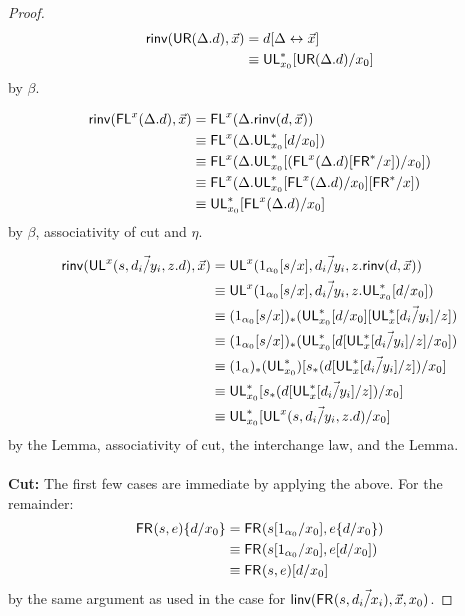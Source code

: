 \begin{proof}
\begin{align*}
\mathsf{rinv}(\mathsf{UR}(\Delta.d),\vec{x}) &= d[\Delta \leftrightarrow \vec{x}]\\
&\equiv \mathsf{UL}^*_{x_0}[\mathsf{UR}(\Delta.d)/x_0]
\end{align*}
by $\beta$.

\begin{align*}
\mathsf{rinv}(\mathsf{FL}^{x}(\Delta.d),\vec{x}) 
&= \mathsf{FL}^{x}(\Delta.\mathsf{rinv}(d,\vec{x})) \\
&\equiv \mathsf{FL}^{x}(\Delta.\mathsf{UL}^*_{x_0}[d/x_0]) \\
&\equiv \mathsf{FL}^{x}(\Delta.\mathsf{UL}^*_{x_0}[(\mathsf{FL}^{x}(\Delta.d)[\mathsf{FR}^*/x])/x_0]) \\
&\equiv \mathsf{FL}^{x}(\Delta.\mathsf{UL}^*_{x_0}[\mathsf{FL}^{x}(\Delta.d)/x_0][\mathsf{FR}^*/x]) \\
&\equiv \mathsf{UL}^*_{x_0}[\mathsf{FL}^{x}(\Delta.d)/x_0]
\end{align*}
by $\beta$, associativity of cut and $\eta$.

\begin{align*}
\mathsf{rinv}(\mathsf{UL}^{x}_{}(s,\vec{d_i/y_i},z.d),\vec{x}) 
&= \mathsf{UL}^{x}_{}(1_{\alpha_0}[s/x],\vec{d_i/y_i},z.\mathsf{rinv}(d,\vec{x}))\\
&\equiv \mathsf{UL}^{x}_{}(1_{\alpha_0}[s/x],\vec{d_i/y_i},z.\mathsf{UL}^*_{x_0}[d/x_0])\\
&\equiv (1_{\alpha_0}[s/x])_*(\mathsf{UL}^*_{x_0}[d/x_0][\mathsf{UL}^*_{x}[\vec{d_i/y_i}]/z]) \\
&\equiv (1_{\alpha_0}[s/x])_*(\mathsf{UL}^*_{x_0}[d[\mathsf{UL}^*_{x}[\vec{d_i/y_i}]/z]/x_0]) \\
&\equiv (1_\alpha)_*(\mathsf{UL}^*_{x_0})[s_*(d[\mathsf{UL}^*_{x}[\vec{d_i/y_i}]/z])/x_0] \\
&\equiv \mathsf{UL}^*_{x_0}[s_*(d[\mathsf{UL}^*_{x}[\vec{d_i/y_i}]/z])/x_0] \\
&\equiv \mathsf{UL}^*_{x_0}[\mathsf{UL}^{x}_{}(s,\vec{d_i/y_i},z.d)/x_0]
\end{align*}
by the Lemma, associativity of cut, the interchange law, and the Lemma.
\\~\\
\textbf{Cut:} The first few cases are immediate by applying the above. For the remainder:
\begin{align*}
\mathsf{FR}_{}(s,e)\{d/x_0\}
&= {\mathsf{FR}_{}(s[1_{\alpha_0}/x_0],e\{d/x_0\})}\\
&\equiv {\ensuremath{\mathsf{FR}_{}(s[1_{\alpha_0}/x_0],e[d/x_0])}}\\
&\equiv \mathsf{FR}_{}(s,e)[d/x_0]
\end{align*}
by the same argument as used in the case for $\mathsf{linv}(\mathsf{FR}_{}(s,\vec{d_i/x_i}),\vec{x},x_0)$.


\end{proof}
